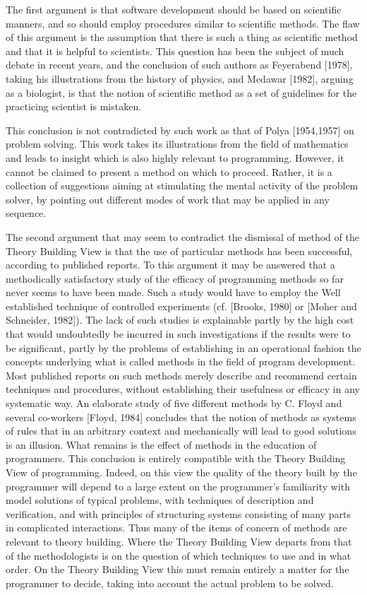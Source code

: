 \documentclass[12pt,letterpaper,twocolumn]{article}
\begin{document}
The first argument is that software development should be based on scientific manners, and so should employ procedures similar to scientific methods. The flaw of this argument is the assumption that there is such a thing as scientific method and that it is helpful to scientists. This question has been the subject of much debate in recent years, and the conclusion of such authors as Feyerabend [1978], taking his illustrations from the history of physics, and Medawar [1982], arguing as a biologist, is that the notion of scientific method as a set of guidelines for the practicing scientist is mistaken.

This conclusion is not contradicted by such work as that of Polya [1954,1957] on problem solving. This work takes its illustrations from the field of mathematics and leads to insight which is also highly relevant to programming. However, it cannot be claimed to present a method on which to proceed. Rather, it is a collection of suggestions aiming at stimulating the mental activity of the problem solver, by pointing out different modes of work that may be applied in any sequence.

The second argument that may seem to contradict the dismissal of method of the Theory Building View is that the use of particular methods has been successful, according to published reports. To this argument it may be answered that a methodically satisfactory study of the efficacy of programming methods so far never seems to have been made. Such a study would have to employ the Well established technique of controlled experiments (cf. [Brooks, 1980] or [Moher and Schneider, 1982]). The lack of such studies is explainable partly by the high cost that would undoubtedly be incurred in such investigations if the results were to be significant, partly by the problems of establishing in an operational fashion the concepts underlying what is called methods in the field of program development. Most published reports on such methods merely describe and recommend certain techniques and procedures, without establishing their usefulness or efficacy in any systematic way. An elaborate study of five different methods by C. Floyd and several co-workers [Floyd, 1984] concludes that the notion of methods as systems of rules that in an arbitrary context and mechanically will lead to good solutions is an illusion. What remains is the effect of methods in the education of programmers. This conclusion is entirely compatible with the Theory Building View of programming. Indeed, on this view the quality of the theory built by the programmer will depend to a large extent on the programmer's familiarity with model solutions of typical problems, with techniques of description and verification, and with principles of structuring systems consisting of many parts in complicated interactions. Thus many of the items of concern of methods are relevant to theory building. Where the Theory Building View departs from that of the methodologists is on the question of which techniques to use and in what order. On the Theory Building View this must remain entirely a matter for the programmer to decide, taking into account the actual problem to be solved.
\end{document}
